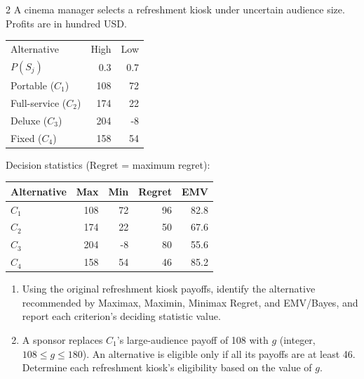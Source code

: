 \begin{multicols}{2}
\raggedcolumns
{}
A cinema manager selects a refreshment kiosk under uncertain audience size. Profits are in hundred USD.

\begin{center}\small\setlength{\tabcolsep}{4pt}
	\begin{tabular}{lrr}\toprule
		Alternative & High & Low\\
		$P(S_j)$ & 0.3 & 0.7\\ \midrule
				Portable ($C_1$) & 108 & 72\\
		Full-service ($C_2$) & 174 & 22\\
		Deluxe ($C_3$) & 204 & -8\\
		Fixed ($C_4$) & 158 & 54\\
		\bottomrule
	\end{tabular}
\end{center} \vspace{-3mm}

Decision statistics (Regret = maximum regret):

\begin{center}\small\setlength{\tabcolsep}{4pt}
	\begin{tabular}{lrrrr}\toprule
		Alternative & Max & Min & Regret & EMV\\ \midrule
				$C_1$ & 108 & 72 & 96 & 82.8\\
		$C_2$ & 174 & 22 & 50 & 67.6\\
		$C_3$ & 204 & -8 & 80 & 55.6\\
		$C_4$ & 158 & 54 & 46 & 85.2\\
		\bottomrule
	\end{tabular}
\end{center}

\begin{enumerate}[label=\textbf{(\alph*)},leftmargin=*]
	\item Using the original refreshment kiosk payoffs, identify the alternative recommended by Maximax, Maximin, Minimax Regret, and EMV/Bayes, and report each criterion's deciding statistic value. 

	\item A sponsor replaces $C_1$'s large-audience payoff of 108 with $g$ (integer, $108\leq g\leq180$). An alternative is eligible only if all its payoffs are at least 46. Determine each refreshment kiosk's eligibility based on the value of $g$. 


\end{enumerate}
\end{multicols}
